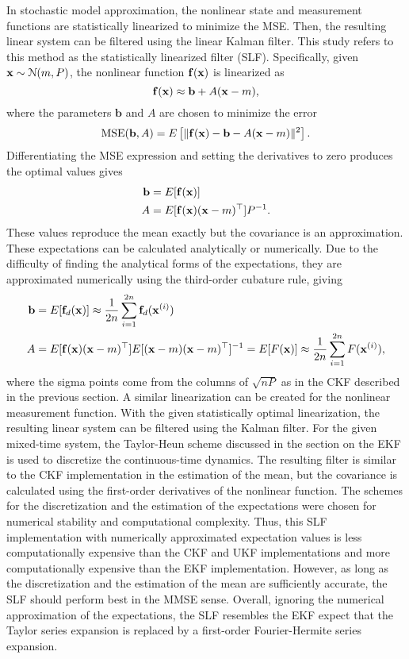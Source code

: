 \documentclass[../zhang_thesis.tex]{subfiles}
\begin{document}
In stochastic model approximation, the nonlinear state and measurement functions are statistically linearized to minimize the MSE. Then, the resulting linear system can be filtered using the linear Kalman filter. This study refers to this method as the statistically linearized filter (SLF). Specifically, given $\mathbf{x}\sim\mathcal{N}(m,P)$, the nonlinear function $\mathbf{f}(\mathbf{x})$ is linearized as~\cite{sarkka13,li04}
\begin{equation}
    \mathbf{f}(\mathbf{x}) \approx \mathbf{b} + A (\mathbf{x} - m),
\end{equation}
where the parameters $\mathbf{b}$ and $A$ are chosen to minimize the error
\begin{equation}
    \text{MSE}(\mathbf{b},A) = E \left[ \| \mathbf{f}(\mathbf{x}) - \mathbf{b} - A(\mathbf{x}-m) \|^2 \right].
\end{equation}
Differentiating the MSE expression and setting the derivatives to zero produces the optimal values gives
\begin{align}
    \mathbf{b} & = E[\mathbf{f}(\mathbf{x})] \\
    A & = E[\mathbf{f}(\mathbf{x}) (\mathbf{x}-m)^\top] P^{-1}.
\end{align}
These values reproduce the mean exactly but the covariance is an approximation. These expectations can be calculated analytically or numerically. Due to the difficulty of finding the analytical forms of the expectations, they are approximated numerically using the third-order cubature rule, giving
\begin{align}
    \mathbf{b} & = E[\mathbf{f}_d(\mathbf{x})] \approx \frac{1}{2n} \sum_{i=1}^{2n} \mathbf{f}_d(\mathbf{x}^{(i)}) \\
    A & = E[\mathbf{f}(\mathbf{x})(\mathbf{x}-m)^\top] E[(\mathbf{x}-m)(\mathbf{x}-m)^\top]^{-1} = E[F(\mathbf{x})] \approx \frac{1}{2n} \sum_{i=1}^{2n} F(\mathbf{x}^{(i)}),
\end{align}
where the sigma points come from the columns of $\sqrt{nP}$ as in the CKF described in the previous section. A similar linearization can be created for the nonlinear measurement function. With the given statistically optimal linearization, the resulting linear system can be filtered using the Kalman filter. For the given mixed-time system, the Taylor-Heun scheme discussed in the section on the EKF is used to discretize the continuous-time dynamics. The resulting filter is similar to the CKF implementation in the
estimation of the mean, but the covariance is calculated using the first-order derivatives of the nonlinear function. The schemes for the discretization and the estimation of the expectations were chosen for numerical stability and computational complexity. Thus, this SLF implementation with numerically approximated expectation values is less computationally expensive than the CKF and UKF implementations and more computationally expensive than the EKF implementation. However, as long as the discretization and the estimation of the mean are sufficiently accurate, the SLF should perform best in the MMSE sense. Overall,
ignoring the numerical approximation of the expectations, the SLF resembles the EKF expect that the Taylor series expansion is replaced by a first-order Fourier-Hermite series expansion.
\end{document}
